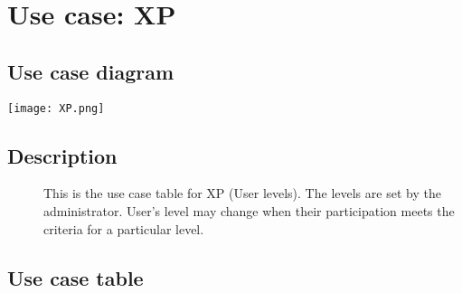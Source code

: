 \section{Use case: XP}
	\subsection{Use case diagram}
\texttt{[image: XP.png]}
	\subsection{Description}
	\begin{description}
		\item[] This is the use case table for XP (User levels). The levels are set by the administrator. User's level may change when their participation meets the criteria for a particular level.  
	\end{description}
	\subsection{Use case table}

